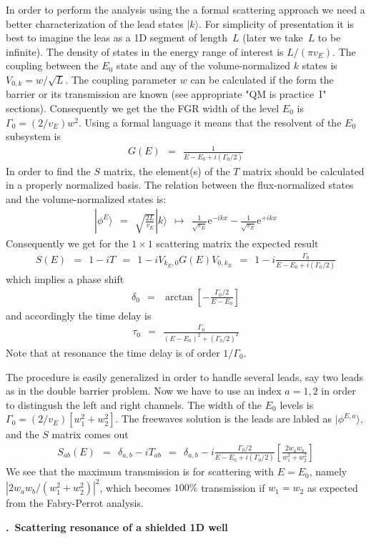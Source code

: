 \documentclass[onecolumn,fleqn, 11pt]{revtex4}
\newcommand{\eexp}{\mathrm{e}^}
\newcommand{\beq}{\begin{eqnarray}}
\newcommand{\eeq}{\end{eqnarray}}
\renewcommand{\thesubsection}{\arabic{subsection}}
\renewcommand{\thesubsubsection}{\arabic{subsubsection}}
\newcommand{\sheadC}[1]
{
\addtocounter{subsubsection}{1}
\vspace{5mm}
{\bf \thesubsection.\thesubsubsection \ #1}  
\nopagebreak
\phantomsection
}
\begin{document}
In order to perform the analysis using the a formal 
scattering approach we need a better characterization 
of the lead states $|k\rangle$. For simplicity of presentation  
it is best to imagine the leas as a 1D segment of length~$L$  
(later we take~$L$ to be infinite). The density 
of states in the energy range of interest is $L/(\pi v_E)$. 
The coupling between the $E_0$ state and any of the 
volume-normalized $k$ states is ${V_{0,k}=w/\sqrt{L}}$. 
The coupling parameter $w$ can be calculated 
if the form the barrier or its transmission are known
(see appropriate "QM is practice~I" sections).    
Consequently we get the the FGR width of the level $E_0$ 
is  ${\Gamma_0=(2/v_E)w^2}$. Using a formal language 
it means that the resolvent of the $E_0$ subsystem is 
\beq
G(E) \ \ = \ \ \frac{1}{E-E_0+i(\Gamma_0/2)}
\eeq 
In order to find the $S$ matrix, the element(s)  
of the $T$ matrix should be calculated in a 
properly normalized basis. The relation between the 
flux-normalized states and the volume-normalized states is: 
\beq
|\phi^E\rangle \ \ = \ \ \sqrt{\frac{2L}{v_E}} |k\rangle 
\ \ \longmapsto \ \  \frac{1}{\sqrt{v_E}}\eexp{-ikx} - \frac{1}{\sqrt{v_E}}\eexp{+ikx}
\eeq 
Consequently we get for the $1\times1$ scattering matrix the expected result 
\beq
S(E) \ \ = \ \ 1-iT \ \ = \ \ 1-iV_{k_E,0}G(E)V_{0,k_E} \ \ = \ \ 1-i\frac{\Gamma_0}{E-E_0+i(\Gamma_0/2)}
\eeq 
which implies a phase shift
\beq
\delta_{0} \ \ = \ \ \arctan\left[-\frac{\Gamma_0/2}{E-E_0}\right] 
\eeq 
and accordingly the time delay is 
\beq
\tau_0 \ \ = \ \ \frac{\Gamma_0}{(E-E_0)^2+(\Gamma_0/2)^2}
\eeq 
Note that at resonance the time delay is of order $1/\Gamma_0$.

The procedure is easily generalized in order to handle 
several leads, say two leads as in the double barrier problem.
Now we have to use an index ${a=1,2}$ in order to distingush 
the left and right channels. The width of the $E_0$ levels 
is ${\Gamma_0=(2/v_E)[w_1^2+w_2^2]}$. 
The freewaves solution is the leads are labled as $|\phi^{E,a}\rangle$, 
and the $S$ matrix comes out  
\beq
S_{ab}(E) \ \ = \ \ \delta_{a,b}-iT_{ab} \ \ = \ \ 
\delta_{a,b}-i\frac{\Gamma_0/2}{E-E_0+i(\Gamma_0/2)}
\left[\frac{2w_aw_b}{w_1^2+w_2^2}\right]
\eeq 
We see that the maximum transmission is for scattering with ${E=E_0}$,  
namely ${|2w_aw_b/(w_1^2+w_2^2)|^2}$, which becomes $100\%$ transmission  
if ${w_1=w_2}$ as expected from the Fabry-Perrot analysis. 


\sheadC{Scattering resonance of a shielded 1D well}
\end{document}
